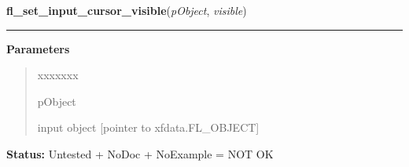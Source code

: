 \hspace{.8\funcindent}\begin{boxedminipage}{\funcwidth}

    \raggedright \textbf{fl\_set\_input\_cursor\_visible}(\textit{pObject}, \textit{visible})

    \vspace{-1.5ex}

    \rule{\textwidth}{0.5\fboxrule}
\setlength{\parskip}{2ex}
\setlength{\parskip}{1ex}
      \textbf{Parameters}
      \vspace{-1ex}

      \begin{quote}
        \begin{Ventry}{xxxxxxx}

          \item[pObject]

          input object [pointer to xfdata.FL\_OBJECT]

        \end{Ventry}

      \end{quote}

\textbf{Status:} Untested + NoDoc + NoExample = NOT OK



    \end{boxedminipage}

    \label{xformslib:library:fl_get_input_numberoflines}

    \vspace{0.5ex}


